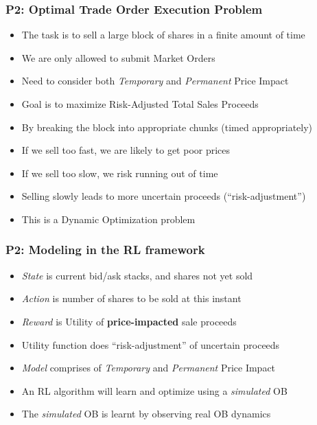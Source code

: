 \documentclass[handout]{beamer}
\begin{document}
\begin{frame}
\frametitle{P2: Optimal Trade Order Execution Problem}
\pause
\begin{itemize}[<+->]
\item The task is to sell a large block of shares in a finite amount of time
\item We are only allowed to submit Market Orders
\item Need to consider both {\em Temporary} and {\em Permanent} Price Impact
\item Goal is to maximize Risk-Adjusted Total Sales Proceeds
\item By breaking the block into appropriate chunks (timed appropriately)
\item If we sell too fast, we are likely to get poor prices
\item If we sell too slow, we risk running out of time
\item Selling slowly leads to more uncertain proceeds (``risk-adjustment'')
\item This is a Dynamic Optimization problem
\end{itemize}
\end{frame}

\begin{frame}
\frametitle{P2: Modeling in the RL framework}
\pause
\begin{itemize}[<+->]
\item {\em State} is current bid/ask stacks, and shares not yet sold
\item {\em Action} is number of shares to be sold at this instant
\item {\em Reward} is Utility of {\bf price-impacted} sale proceeds
\item Utility function does ``risk-adjustment'' of uncertain proceeds
\item {\em Model} comprises of {\em Temporary} and {\em Permanent} Price Impact
\item An RL algorithm will learn and optimize using a {\em simulated} OB
\item The {\em simulated} OB is learnt by observing real OB dynamics
\end{itemize}
\end{frame}
\end{document}
